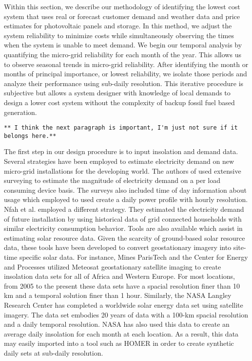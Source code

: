 \documentclass[11p]{article}
\begin{document}
Within this section, we describe our methodology of identifying the lowest cost system that uses real or forecast customer demand and weather data and price estimates for photovoltaic panels and storage.
In this method, we adjust the system reliability to minimize costs while simultaneously observing the times when the system is unable to meet demand.  
We begin our temporal analysis by quantifying the micro-grid reliability for each month of the year. 
This allows us to observe seasonal trends in micro-grid reliability. 
After identifying the month or months of principal importance, or lowest reliability, we isolate those periods and analyze their performance using sub-daily resolution. 
This iterative procedure is subjective but allows a system designer with knowledge of local demands to design a lower cost system without the complexity of backup fossil fuel based generation.




\begin{verbatim}
** I think the next paragraph is important, I'm just not sure if it belongs here.**
\end{verbatim} 
The first step in our design procedure is to input insolation and demand data. 
Several strategies have been employed to estimate electricity demand on new micro-grid installations for the developing world. 
The authors of \cite{Camblong,Alzola} used extensive surveying to estimate the magnitude of electricity demand on a per load consuming device basis. 
The surveys also included time of day information about usage which employed to used create a daily power profile with hourly resolution. 
Nfah et al. \cite{Nfah} employed a different strategy.
They estimated the electricity demand of future installation by using historical data of grid connected households with similar electricity consumption behavior. 
Tools are also available which assist in estimating solar resource data.
Given the scarcity of ground-based solar resource data, these tools have been developed to convert geostationary imagery into site-time specific solar data. 
For instance, Mines ParisTech and the Center for Energy and Processes utilized Meteosat geostationary satellite imaging to create insolation data sets for all of Africa and Western Europe. 
For most locations, from 2005 to the present these data sets have a spacial resolution finer than 10 km and a temporal solution finer than 1 hour.  
Similarly, the NASA Langley Research Center has completed a worldwide solar energy data set using satellite imagery. 
The data set embodies 20 years of data with a 100-km spacial resolution and a daily temporal resolution.  
NASA has also used this data to create an average daily insolation for each month at each location.
As a result, this data may easily imported into a tool such as HOMER in order to create synthetic daily sets at sub-daily resolution.   
\end{document}
